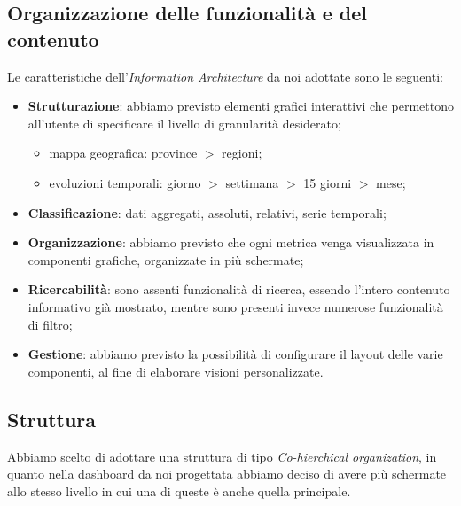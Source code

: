 \subsection{Organizzazione delle funzionalità e del contenuto}
\label{ss:organizzazione-funzionalita-contenuto}
Le caratteristiche dell'\textit{Information Architecture} da noi adottate sono le seguenti:
\begin{itemize}
	\item \textbf{Strutturazione}: abbiamo previsto elementi grafici interattivi che permettono all'utente di specificare il livello di granularità desiderato;
	\begin{itemize}
		\item mappa geografica: province $>$ regioni;
		\item evoluzioni temporali: giorno $>$ settimana $>$ 15 giorni $>$ mese;
	\end{itemize}
	\item \textbf{Classificazione}: dati aggregati, assoluti, relativi, serie temporali;
	\item \textbf{Organizzazione}: abbiamo previsto che ogni metrica venga visualizzata in componenti grafiche, organizzate in più schermate;
	\item \textbf{Ricercabilità}: sono assenti funzionalità di ricerca, essendo l'intero contenuto informativo già mostrato, mentre sono presenti invece numerose funzionalità di filtro;
	\item \textbf{Gestione}: abbiamo previsto la possibilità di configurare il layout delle varie componenti, al fine di elaborare visioni personalizzate.
\end{itemize}

\subsection{Struttura}
\label{ss:struttura}
Abbiamo scelto di adottare una struttura di tipo \textit{Co-hierchical organization}, in quanto nella dashboard da noi progettata abbiamo deciso di avere più schermate allo stesso livello in cui una di queste è anche quella principale.
